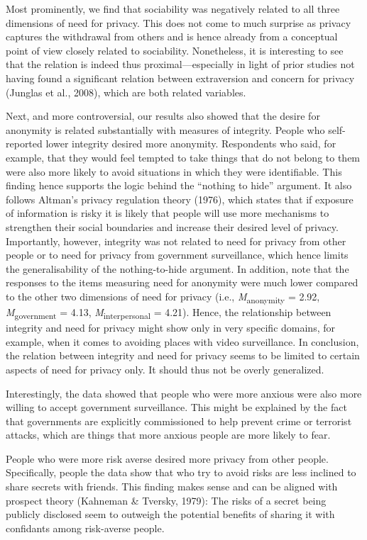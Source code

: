 \documentclass[man,floatsintext]{apa6}
\begin{document}
Most prominently, we find that sociability was negatively related to all three dimensions of need for privacy. This does not come to much surprise as privacy captures the withdrawal from others and is hence already from a conceptual point of view closely related to sociability. Nonetheless, it is interesting to see that the relation is indeed thus proximal---especially in light of prior studies not having found a significant relation between extraversion and concern for privacy (Junglas et al., 2008), which are both related variables.

Next, and more controversial, our results also showed that the desire for anonymity is related substantially with measures of integrity. People who self-reported lower integrity desired more anonymity. Respondents who said, for example, that they would feel tempted to take things that do not belong to them were also more likely to avoid situations in which they were identifiable. This finding hence supports the logic behind the \enquote{nothing to hide} argument. It also follows Altman's privacy regulation theory (1976), which states that if exposure of information is risky it is likely that people will use more mechanisms to strengthen their social boundaries and increase their desired level of privacy. Importantly, however, integrity was not related to need for privacy from other people or to need for privacy from government surveillance, which hence limits the generalisability of the nothing-to-hide argument. In addition, note that the responses to the items measuring need for anonymity were much lower compared to the other two dimensions of need for privacy (i.e., \emph{M}\textsubscript{anonymity} = 2.92, \emph{M}\textsubscript{government} = 4.13, \emph{M}\textsubscript{interpersonal} = 4.21). Hence, the relationship between integrity and need for privacy might show only in very specific domains, for example, when it comes to avoiding places with video surveillance. In conclusion, the relation between integrity and need for privacy seems to be limited to certain aspects of need for privacy only. It should thus not be overly generalized.

Interestingly, the data showed that people who were more anxious were also more willing to accept government surveillance. This might be explained by the fact that governments are explicitly commissioned to help prevent crime or terrorist attacks, which are things that more anxious people are more likely to fear.

People who were more risk averse desired more privacy from other people. Specifically, people the data show that who try to avoid risks are less inclined to share secrets with friends. This finding makes sense and can be aligned with prospect theory (Kahneman \& Tversky, 1979): The risks of a secret being publicly disclosed seem to outweigh the potential benefits of sharing it with confidants among risk-averse people.
\end{document}
